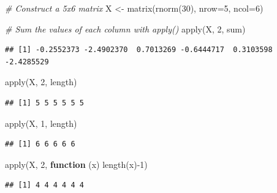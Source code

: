 \documentclass[
]{book}
\newenvironment{Shaded}{\begin{snugshade}}{\end{snugshade}}
\newcommand{\AttributeTok}[1]{\textcolor[rgb]{0.77,0.63,0.00}{#1}}
\newcommand{\CommentTok}[1]{\textcolor[rgb]{0.56,0.35,0.01}{\textit{#1}}}
\newcommand{\ControlFlowTok}[1]{\textcolor[rgb]{0.13,0.29,0.53}{\textbf{#1}}}
\newcommand{\DecValTok}[1]{\textcolor[rgb]{0.00,0.00,0.81}{#1}}
\newcommand{\FunctionTok}[1]{\textcolor[rgb]{0.00,0.00,0.00}{#1}}
\newcommand{\NormalTok}[1]{#1}
\newcommand{\OtherTok}[1]{\textcolor[rgb]{0.56,0.35,0.01}{#1}}
\newcommand{\SpecialCharTok}[1]{\textcolor[rgb]{0.00,0.00,0.00}{#1}}
\theoremstyle{definition}
\theoremstyle{definition}
\theoremstyle{definition}
\theoremstyle{definition}
\theoremstyle{remark}
\begin{document}
\begin{Shaded}
\begin{Highlighting}[]
\CommentTok{\# Construct a 5x6 matrix}
\NormalTok{X }\OtherTok{\textless{}{-}} \FunctionTok{matrix}\NormalTok{(}\FunctionTok{rnorm}\NormalTok{(}\DecValTok{30}\NormalTok{), }\AttributeTok{nrow=}\DecValTok{5}\NormalTok{, }\AttributeTok{ncol=}\DecValTok{6}\NormalTok{)}

\CommentTok{\# Sum the values of each column with \textasciigrave{}apply()\textasciigrave{}}
\FunctionTok{apply}\NormalTok{(X, }\DecValTok{2}\NormalTok{, sum)}
\end{Highlighting}
\end{Shaded}

\begin{verbatim}
## [1] -0.2552373 -2.4902370  0.7013269 -0.6444717  0.3103598 -2.4285529
\end{verbatim}

\begin{Shaded}
\begin{Highlighting}[]
\FunctionTok{apply}\NormalTok{(X, }\DecValTok{2}\NormalTok{, length)}
\end{Highlighting}
\end{Shaded}

\begin{verbatim}
## [1] 5 5 5 5 5 5
\end{verbatim}

\begin{Shaded}
\begin{Highlighting}[]
\FunctionTok{apply}\NormalTok{(X, }\DecValTok{1}\NormalTok{, length)}
\end{Highlighting}
\end{Shaded}

\begin{verbatim}
## [1] 6 6 6 6 6
\end{verbatim}

\begin{Shaded}
\begin{Highlighting}[]
\FunctionTok{apply}\NormalTok{(X, }\DecValTok{2}\NormalTok{, }\ControlFlowTok{function}\NormalTok{ (x) }\FunctionTok{length}\NormalTok{(x)}\SpecialCharTok{{-}}\DecValTok{1}\NormalTok{)}
\end{Highlighting}
\end{Shaded}

\begin{verbatim}
## [1] 4 4 4 4 4 4
\end{verbatim}
\end{document}
